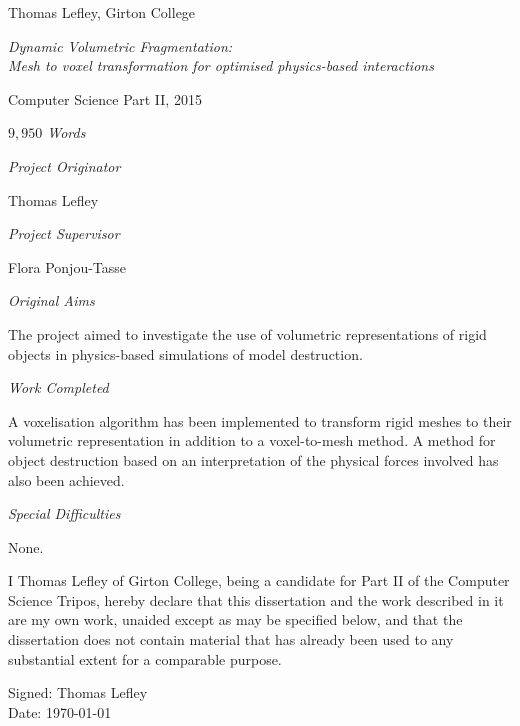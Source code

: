 \documentclass[a4 paper,twoside,openright,12pt]{book}
\begin{document}
\cleardoublepage



\centerline{\large{Thomas Lefley, Girton College}}
\begin{center}
	{\emph{\large{Dynamic Volumetric Fragmentation:\\Mesh to voxel transformation for optimised physics-based interactions}}}
\end{center}

\medskip
\centerline{\large{Computer Science Part II, 2015}}
\medskip
\vspace{0.4in}
\medskip
\centerline{\emph{\large{$9,950$ Words}}}
\medskip
\vspace{0.4in}
\medskip
\centerline{\emph{\large{Project Originator}}}
\medskip
\centerline{\large Thomas Lefley}
\medskip
\centerline{\emph{\large{Project Supervisor}}}
\medskip
\centerline{\large Flora Ponjou-Tasse}
\medskip
\vspace{0.4in}
\medskip
\centerline{\large{\emph{Original Aims}}}
\begin{center}
	The project aimed to investigate the use of volumetric representations of rigid objects in physics-based simulations of model destruction.
\end{center}
\medskip
\vspace{0.4in}
\medskip
\centerline{\large{\emph{Work Completed}}}
\begin{center}
	A voxelisation algorithm has been implemented to transform rigid meshes to their volumetric representation in addition to a voxel-to-mesh method. A method for object destruction based on an interpretation of the physical forces involved has also been achieved.
\end{center}
\vspace{0.4in}
\medskip
\centerline{\large{\emph{Special Difficulties}}}
\begin{center}
	None.
\end{center}
\vspace{0.4in}

\begin{framed}
I Thomas Lefley of Girton College, being a candidate for Part II of the Computer Science Tripos, hereby declare that this dissertation and the work described in it are my own work, unaided except as may be specified below, and that the dissertation does not contain material that has already been used to any substantial extent for a comparable purpose.\par Signed: Thomas Lefley\\ Date: \today
\end{framed}
\end{document}
